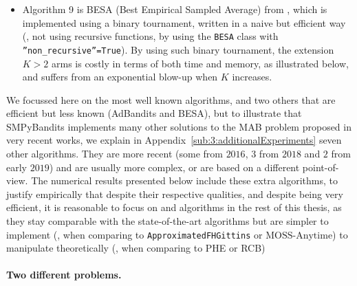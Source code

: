 \begin{itemize}
    \item Algorithm 9 is
    BESA (Best Empirical Sampled Average) from \cite{Baransi2014},
    which is implemented using a binary tournament, written in a naive but efficient way
    (\ie, not using recursive functions, by using the \texttt{BESA} class with \texttt{''non\_recursive''=True}).
    By using such binary tournament, the extension $K>2$ arms is costly in terms of both time and memory, as illustrated below, and suffers from an exponential blow-up when $K$ increases.
\end{itemize}

We focussed here on the most well known algorithms, and two others that are efficient but less known (AdBandits and BESA),
but to illustrate that SMPyBandits implements many other solutions to the MAB problem proposed in very recent works, we explain in Appendix~\ref{sub:3:additionalExperiments} seven other algorithms.
They are more recent (some from $2016$, $3$ from $2018$ and $2$ from early $2019$) and are usually more complex, or are based on a different point-of-view.
The numerical results presented below include these extra algorithms, to justify empirically that despite their respective qualities, and despite being very efficient, it is reasonable to focus on \UCB{} and \klUCB{} algorithms in the rest of this thesis, as they stay comparable with the state-of-the-art algorithms but are simpler to implement (\eg, when comparing \UCB{} to \texttt{ApproximatedFHGittins} or $\mathrm{MOSS}$-$\mathrm{Anytime}$) to manipulate theoretically (\eg, when comparing \klUCB{} to PHE or RCB)


\paragraph{Two different problems.}

